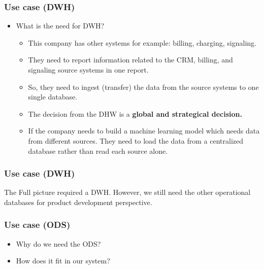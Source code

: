 
\begin{frame}
\frametitle{Use case (DWH)}

\begin{itemize}[<+->]

\item What is the need for DWH?		
\begin{itemize}[<+->]
\item This company has other systems for example: billing, charging, signaling.	
\item They need to report information related to the CRM, billing, and signaling source systems in one report.
\item So, they need to ingest (transfer) the data from the source systems to one single database.
\item The decision from the DHW is a \textbf{global and strategical decision.}
\item If the company needs to build a machine learning model which needs data from different sources. They need to load the data from a centralized database rather than read each source alone.
\end{itemize}

\end{itemize}

\end{frame}


\begin{frame}
\frametitle{Use case (DWH)}
\centering
The Full picture required a DWH. However, we still need the other operational databases for product development perspective.


\end{frame}

\begin{frame}
\frametitle{Use case (ODS)}
\centering

\begin{itemize}[<+->]
\item Why do we need the ODS?
\item 	How does it fit in our system?
\end{itemize}


\end{frame}



